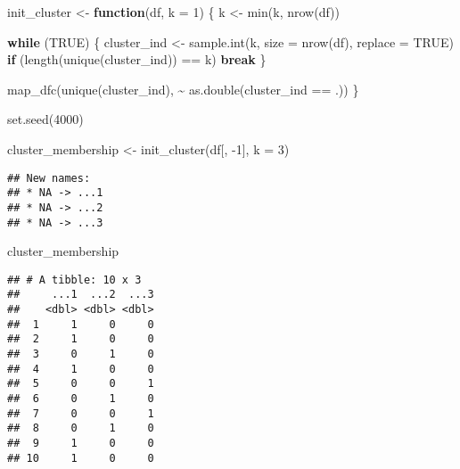 \documentclass[
]{book}
\newenvironment{Shaded}{\begin{snugshade}}{\end{snugshade}}
\newcommand{\AttributeTok}[1]{\textcolor[rgb]{0.77,0.63,0.00}{#1}}
\newcommand{\ConstantTok}[1]{\textcolor[rgb]{0.00,0.00,0.00}{#1}}
\newcommand{\ControlFlowTok}[1]{\textcolor[rgb]{0.13,0.29,0.53}{\textbf{#1}}}
\newcommand{\DecValTok}[1]{\textcolor[rgb]{0.00,0.00,0.81}{#1}}
\newcommand{\FunctionTok}[1]{\textcolor[rgb]{0.00,0.00,0.00}{#1}}
\newcommand{\NormalTok}[1]{#1}
\newcommand{\OtherTok}[1]{\textcolor[rgb]{0.56,0.35,0.01}{#1}}
\newcommand{\SpecialCharTok}[1]{\textcolor[rgb]{0.00,0.00,0.00}{#1}}
\begin{document}
\begin{Shaded}
\begin{Highlighting}[]
\NormalTok{init\_cluster }\OtherTok{\textless{}{-}} \ControlFlowTok{function}\NormalTok{(df, }\AttributeTok{k =} \DecValTok{1}\NormalTok{) \{}
\NormalTok{  k }\OtherTok{\textless{}{-}} \FunctionTok{min}\NormalTok{(k, }\FunctionTok{nrow}\NormalTok{(df))}
  
  \ControlFlowTok{while}\NormalTok{ (}\ConstantTok{TRUE}\NormalTok{) \{}
\NormalTok{    cluster\_ind }\OtherTok{\textless{}{-}} \FunctionTok{sample.int}\NormalTok{(k, }\AttributeTok{size =} \FunctionTok{nrow}\NormalTok{(df), }\AttributeTok{replace =} \ConstantTok{TRUE}\NormalTok{)}
    \ControlFlowTok{if}\NormalTok{ (}\FunctionTok{length}\NormalTok{(}\FunctionTok{unique}\NormalTok{(cluster\_ind)) }\SpecialCharTok{==}\NormalTok{ k) }\ControlFlowTok{break}
\NormalTok{  \}}
  
  \FunctionTok{map\_dfc}\NormalTok{(}\FunctionTok{unique}\NormalTok{(cluster\_ind), }\SpecialCharTok{\textasciitilde{}} \FunctionTok{as.double}\NormalTok{(cluster\_ind }\SpecialCharTok{==}\NormalTok{ .))}
\NormalTok{\}}

\FunctionTok{set.seed}\NormalTok{(}\DecValTok{4000}\NormalTok{)}

\NormalTok{cluster\_membership }\OtherTok{\textless{}{-}} \FunctionTok{init\_cluster}\NormalTok{(df[, }\SpecialCharTok{{-}}\DecValTok{1}\NormalTok{], }\AttributeTok{k =} \DecValTok{3}\NormalTok{)}
\end{Highlighting}
\end{Shaded}

\begin{verbatim}
## New names:
## * NA -> ...1
## * NA -> ...2
## * NA -> ...3
\end{verbatim}

\begin{Shaded}
\begin{Highlighting}[]
\NormalTok{cluster\_membership}
\end{Highlighting}
\end{Shaded}

\begin{verbatim}
## # A tibble: 10 x 3
##     ...1  ...2  ...3
##    <dbl> <dbl> <dbl>
##  1     1     0     0
##  2     1     0     0
##  3     0     1     0
##  4     1     0     0
##  5     0     0     1
##  6     0     1     0
##  7     0     0     1
##  8     0     1     0
##  9     1     0     0
## 10     1     0     0
\end{verbatim}
\end{document}
